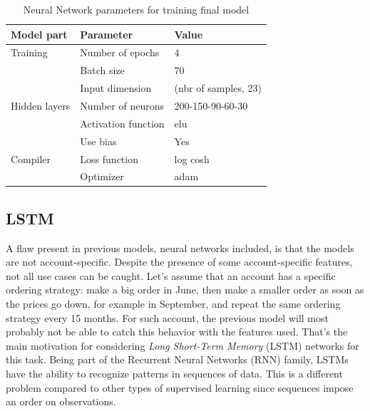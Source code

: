 \begin{table}[h]
    \centering
    \begin{tabular}{l|l|l}
        \textbf{Model part}           & \textbf{Parameter}                 & \textbf{Value}         \\ \hline
        Training                      & Number of epochs                   & 4                     \\
                                      & Batch size                         & 70             \\
                                      & Input dimension                    & (nbr of samples, 23)                     \\ \hline
        Hidden layers                 & Number of neurons                  & 200-150-90-60-30                     \\
                                      & Activation function                & elu                     \\
                                      & Use bias                           & Yes                     \\ \hline
        Compiler                      & Loss function                      & log cosh \\
                                      & Optimizer                          & adam
    \end{tabular}
    \caption{Neural Network parameters for training final model}
    \label{tab:nn-final-parameters}
\end{table}


\subsection{LSTM}
A flaw present in previous models, neural networks included, is that the models are not account-specific. Despite the presence of some account-specific features, not all use cases can be caught. Let's assume that an account has a specific ordering strategy: make a big order in June, then make a smaller order as soon as the prices go down, for example in September, and repeat the same ordering strategy every 15 months. For such account, the previous model will most probably not be able to catch this behavior with the features used. That's the main motivation for considering \textit{Long Short-Term Memory} (LSTM) networks for this task. Being part of the Recurrent Neural Networks (RNN) family, LSTMs have the ability to recognize patterns in sequences of data. This is a different problem compared to other types of supervised learning since sequences impose an order on observations.

